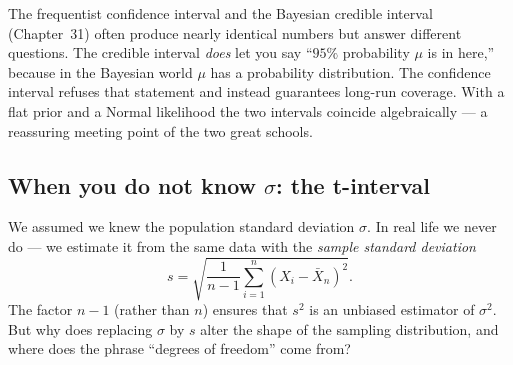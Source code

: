 \begin{connectionbox}
The frequentist confidence interval and the Bayesian credible interval (Chapter~31)
often produce nearly identical numbers but answer different questions. The credible
interval \emph{does} let you say ``$95\%$ probability $\mu$ is in here,'' because in the
Bayesian world $\mu$ has a probability distribution. The confidence interval refuses
that statement and instead guarantees long-run coverage. With a flat prior and a Normal
likelihood the two intervals coincide algebraically --- a reassuring meeting point of
the two great schools.
\end{connectionbox}

\subsection{When you do not know $\sigma$: the t-interval}

We assumed we knew the population standard deviation $\sigma$. In real life we never do
--- we estimate it from the same data with the \emph{sample standard deviation}
\[
  s = \sqrt{\frac{1}{n-1}\sum_{i=1}^n (X_i - \bar X_n)^2}.
\]
The factor $n-1$ (rather than $n$) ensures that $s^2$ is an unbiased estimator of
$\sigma^2$. But why does replacing $\sigma$ by $s$ alter the shape of the sampling
distribution, and where does the phrase ``degrees of freedom'' come from?

